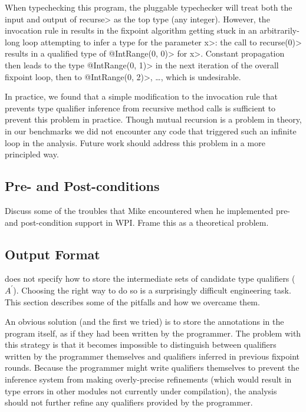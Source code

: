 When typechecking this program, the pluggable typechecker will
treat both the input and output of \<recurse> as the top type
(\ie any integer). However, the invocation rule in 
results in the fixpoint algorithm getting stuck in an arbitrarily-long
loop attempting to infer a type for the parameter \<x>: the call to \<recurse(0)>
results in a qualified type of \<@IntRange(0, 0)> for \<x>. Constant
propagation then leads to the type \<@IntRange(0, 1)> in the next iteration
of the overall fixpoint loop, then to \<@IntRange(0, 2)>, \ldots, which
is undesirable.

In practice, we found that a simple modification to the invocation rule that
prevents type qualifier inference from recursive method calls is sufficient
to prevent this problem in practice.
 Though mutual recursion is a problem in
theory, in our benchmarks we did not encounter any code that triggered such
an infinite loop in the analysis. Future work should address this problem in
a more principled way.

\subsection{Pre- and Post-conditions}
\label{sec:pre-post-conditions}

Discuss some of the troubles that Mike encountered when
he implemented pre- and post-condition support in WPI\@. Frame
this as a theoretical problem. 

\subsection{Output Format}
\label{sec:output}


 does not specify how to store the intermediate
sets of candidate type qualifiers (\ie $A^{\prime}$). Choosing the right way
to do so is a surprisingly difficult engineering task. This section describes some
of the pitfalls and how we overcame them.

An obvious solution (and the first we tried) is to store the annotations
in the program itself, as if they had been written by the programmer. The
problem with this strategy is that it becomes impossible to distinguish
between qualifiers written by the programmer themselves and qualifiers
inferred in previous fixpoint rounds. Because the programmer might write
qualifiers themselves to prevent the inference system from making overly-precise
refinements (which would result in type errors in \eg other modules not currently
under compilation), the analysis should not further refine any qualifiers
provided by the programmer.

